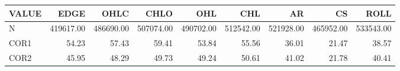 \begin{table}[ht]
\centering
\begin{tabular}{lrrrrrrrr}
  \hline
VALUE & EDGE & OHLC & CHLO & OHL & CHL & AR & CS & ROLL \\ 
  \hline
N & 419617.00 & 486690.00 & 507074.00 & 490702.00 & 512542.00 & 521928.00 & 465952.00 & 533543.00 \\ 
  COR1 & 54.23 & 57.43 & 59.41 & 53.84 & 55.56 & 36.01 & 21.47 & 38.57 \\ 
  COR2 & 45.95 & 48.29 & 49.73 & 49.24 & 50.61 & 41.02 & 21.78 & 40.41 \\ 
   \hline
\end{tabular}
\end{table}
